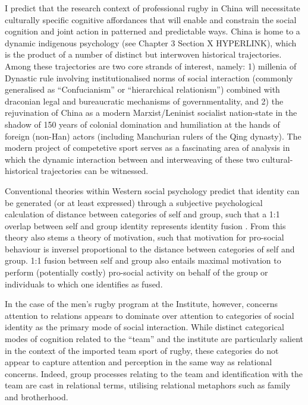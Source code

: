 I predict that the research context of professional rugby in China will necessitate culturally specific cognitive affordances that will enable and constrain the social cognition and joint action in patterned and predictable ways.  China is home to a dynamic indigenous psychology (see Chapter 3 Section X HYPERLINK), which is the product of a number of distinct but interwoven historical trajectories.  Among these trajectories are two core strands of interest, namely: 1) millenia of Dynastic rule involving institutionalised norms of social interaction (commonly generalised as ``Confucianism'' or ``hierarchical relationism'') combined with draconian legal and bureaucratic mechanisms of governmentality, and 2) the rejuvination of China as a modern Marxist/Leninist socialist nation-state in the shadow of 150 years of colonial domination and humiliation at the hands of foreign (non-Han) actors (including Manchurian rulers of the Qing dynasty).  The modern project of competetive sport serves as a fascinating area of analysis in which the dynamic interaction between and interweaving of these two cultural-historical trajectories can be witnessed.

Conventional theories within Western social psychology predict that identity can be generated (or at least expressed) through a subjective psychological calculation of distance between categories of self and group, such that a 1:1 overlap between self and group identity represents identity fusion \citep{Swann2009}.  From this theory also stems a theory of motivation, such that motivation for pro-social behaviour is inversel proportional to the distance between categories of self and group. 1:1 fusion between self and group also entails maximal motivation to perform (potentially costly) pro-social activity on behalf of the group or individuals to which one identifies as fused.

In the case of the men's rugby program at the Institute, however, concerns attention to relations appears to dominate over attention to categories of social identity as the primary mode of social interaction.  While distinct categorical modes of cognition related to the ``team'' and the institute are particularly salient in the context of the imported team sport of rugby, these categories do not appear to capture attention and perception in the same way as relational concerns.  Indeed, group processes relating to the team and identification with the team are cast in relational terms, utilising relational metaphors such as family and brotherhood.

